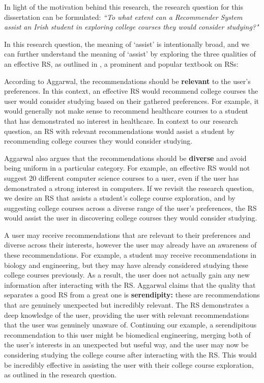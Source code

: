 In light of the motivation behind this research, the research question for this dissertation can be formulated:
\emph{``To what extent can a Recommender System assist an Irish student in exploring college courses they would consider studying?"}

In this research question, the meaning of `assist' is intentionally broad, 
and we can further understand the meaning of `assist' by exploring the three qualities of an effective RS, as outlined in \cite{aggarwal2016recommender}, a prominent and popular textbook on RSs:

According to Aggarwal, the recommendations should be \textbf{relevant} to the user's preferences. 
In this context, an effective RS would recommend college courses the user would consider studying based on their gathered preferences.
For example, it would generally not make sense to recommend healthcare courses to a student that has demonstrated no interest in healthcare.
In context to our research question, an RS with relevant recommendations would assist a student by recommending college courses they would consider studying.

Aggarwal also argues that the recommendations should be \textbf{diverse} and avoid being uniform in a particular category.
For example, an effective RS would not suggest 20 different computer science courses to a user, even if the user has demonstrated 
a strong interest in computers. If we revisit the research question, we desire an RS that assists a student's college course exploration,
and by suggesting college courses across a diverse range of the user's preferences,
the RS would assist the user in discovering college courses they would consider studying.

A user may receive recommendations that are relevant to their preferences and diverse across their interests,
however the user may already have an awareness of these recommendations.
For example, a student may receive recommendations in biology and engineering, but they may have already considered studying these college courses previously.
As a result, the user does not actually gain any new information after interacting with the RS.
Aggarwal claims that the quality that separates a good RS from a great one is \textbf{serendipity:}
these are recommendations that are genuinely unexpected but incredibly relevant.
The RS demonstrates a deep knowledge of the user, providing the user with relevant recommendations that the user was genuinely unaware of.
Continuing our example, a serendipitous recommendation to this user might be biomedical engineering, merging both of the user's interests in an unexpected but useful way,
and the user may now be considering studying the college course after interacting with the RS.
This would be incredibly effective in assisting the user with their college course exploration, as outlined in the research question.

